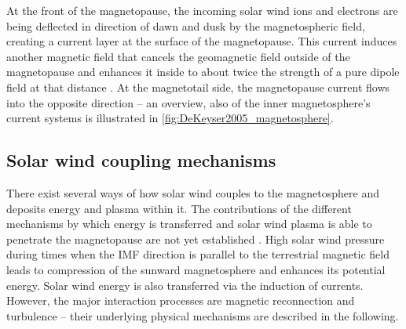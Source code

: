 At the front of the magnetopause, the incoming solar wind ions and electrons are being deflected in direction of dawn and dusk by the magnetospheric field, creating a current layer at the surface of the magnetopause. This current induces another magnetic field that cancels the geomagnetic field outside of the magnetopause and enhances it inside to about twice the strength of a pure dipole field at that distance \citep{DeKeyser2005}. At the magnetotail side, the magnetopause current flows into the opposite direction -- an overview, also of the inner magnetosphere's current systems is illustrated in \autoref{fig:DeKeyser2005_magnetosphere}.
\begin{figure}[htb]
\end{figure}

\pagebreak

\subsection{Solar wind coupling mechanisms}
\label{sec:solar_wind_coupling_mechanisms}
There exist several ways of how solar wind couples to the magnetosphere and deposits energy and plasma within it. The contributions of the different mechanisms by which energy is transferred and solar wind plasma is able to penetrate the magnetopause are not yet established \citep{Phan2005}. High solar wind pressure during times when the IMF direction is parallel to the terrestrial magnetic field leads to compression of the sunward magnetosphere and enhances its potential energy. Solar wind energy is also transferred via the induction of currents. However, the major interaction processes are magnetic reconnection and turbulence -- their underlying physical mechanisms are described in the following.

